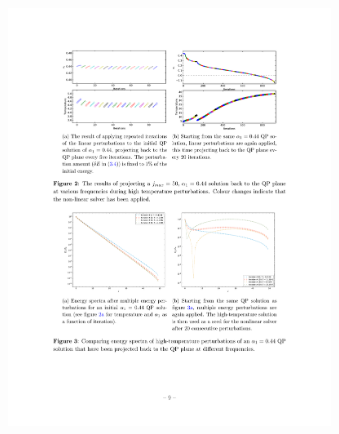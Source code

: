 \documentclass[mathserif,10pt]{beamer}
\begin{document}
{{  \vspace{-0.15in}
  \begin{columns}
  \begin{figure}
  \centering
  \hspace{0.1in}
  \includegraphics[scale=0.75]{reop5}
  \end{figure}
  \begin{figure}
  \centering
  \hspace{-0.1in}

\end{figure}
\end{columns}}}
\end{document}
